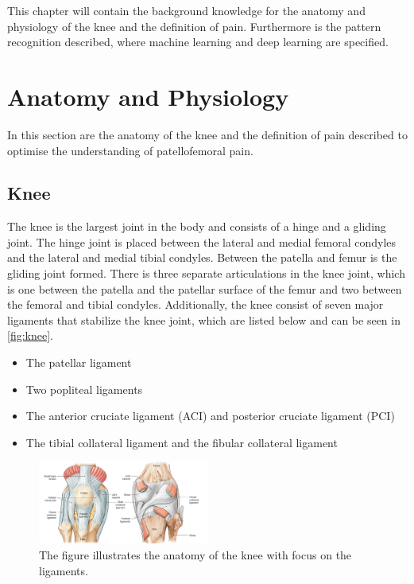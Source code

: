 This chapter will contain the background knowledge for the anatomy and physiology of the knee and the definition of pain. Furthermore is the pattern recognition described, where machine learning and deep learning are specified. 

\section{Anatomy and Physiology}
In this section are the anatomy of the knee and the definition of pain described to optimise the understanding of patellofemoral pain. 

\subsection{Knee}
The knee is the largest joint in the body and consists of a hinge and a gliding joint. The hinge joint is placed between the lateral and medial femoral condyles and the lateral and medial tibial condyles. Between the patella and femur is the gliding joint formed.
There is three separate articulations in the knee joint, which is one between the patella and the patellar surface of the femur and two between the femoral and tibial condyles. Additionally, the knee consist of seven major ligaments that stabilize the knee joint, which are listed below and can be seen in \autoref{fig:knee}.\citep{Martini2012} 

\begin{itemize}
\item The patellar ligament 
\item Two popliteal ligaments
\item The anterior cruciate ligament (ACI) and posterior cruciate ligament (PCI) 
\item The tibial collateral ligament and the fibular collateral ligament \citep{Martini2012}
\end{itemize}

\begin{figure} [H]
\centering
\includegraphics[width=0.5\textwidth]{figures/knee}
\caption{The figure illustrates the anatomy of the knee with focus on the ligaments.}
\label{fig:knee}
\end{figure}


